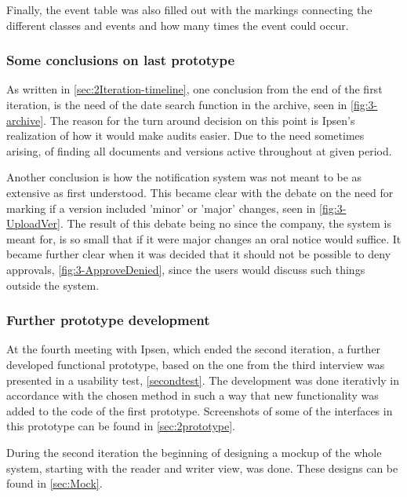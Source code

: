 Finally, the event table was also filled out with the markings connecting the different classes and events and how many times the event could occur.

\subsubsection*{Some conclusions on last prototype}
As written in \cref{sec:2Iteration-timeline}, one conclusion from the end of the first iteration, is the need of the date search function in the archive, seen in \cref{fig:3-archive}.
The reason for the turn around decision on this point is Ipsen's realization of how it would make audits easier.
Due to the need sometimes arising, of finding all documents and versions active throughout at given period.

Another conclusion is how the notification system was not meant to be as extensive as first understood. 
This became clear with the debate on the need for marking if a version included 'minor' or 'major' changes, seen in \cref{fig:3-UploadVer}.
The result of this debate being no since the company, the system is meant for, is so small that if it were major changes an oral notice would suffice.
It became further clear when it was decided that it should not be possible to deny approvals, \cref{fig:3-ApproveDenied}, since the users would discuss such things outside the system.

\subsubsection*{Further prototype development}
At the fourth meeting with Ipsen, which ended the second iteration, a further developed functional prototype, based on the one from the third interview was presented in a usability test, \cref{secondtest}.
The development was done iterativly in accordance with the chosen method in such a way that new functionality was added to the code of the first prototype.
Screenshots of some of the interfaces in this prototype can be found in \cref{sec:2prototype}.

During the second iteration the beginning of designing a mockup of the whole system, starting with the reader and writer view, was done. 
These designs can be found in \cref{sec:Mock}.

